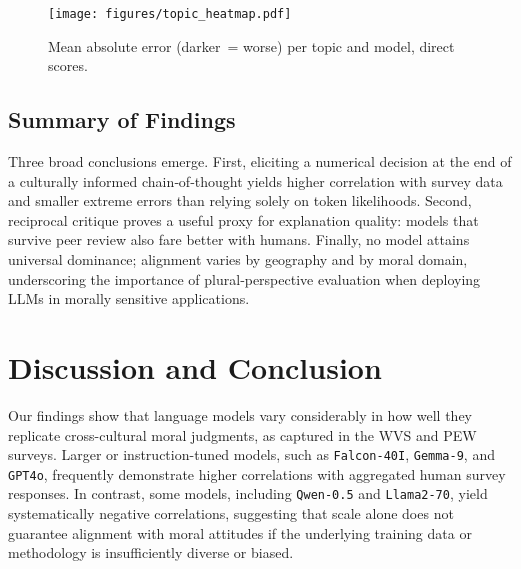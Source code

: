 \documentclass[11pt]{article}
\begin{document}
\begin{figure}[ht]
  \centering
  \texttt{[image: figures/topic\_heatmap.pdf]}
  \caption{\small Mean absolute error (darker = worse) per topic and model,
  direct scores.}
  \label{fig:topic_heat}
\end{figure}

\subsection{Summary of Findings}

Three broad conclusions emerge.  First, eliciting a numerical decision at the
end of a culturally informed chain‑of‑thought yields higher correlation with
survey data and smaller extreme errors than relying solely on token
likelihoods.  Second, reciprocal critique proves a useful proxy for explanation
quality: models that survive peer review also fare better with humans.
Finally, no model attains universal dominance; alignment varies by geography
and by moral domain, underscoring the importance of plural‑perspective
evaluation when deploying LLMs in morally sensitive applications.






































\section{Discussion and Conclusion}
\label{sec:discussion_Conclusion}

Our findings show that language models vary considerably in how well they replicate cross-cultural moral judgments, as captured in the WVS and PEW surveys. Larger or instruction-tuned models, such as \texttt{Falcon-40I}, \texttt{Gemma-9}, and \texttt{GPT4o}, frequently demonstrate higher correlations with aggregated human survey responses. In contrast, some models, including \texttt{Qwen-0.5} and \texttt{Llama2-70}, yield systematically negative correlations, suggesting that scale alone does not guarantee alignment with moral attitudes if the underlying training data or methodology is insufficiently diverse or biased.
\end{document}
